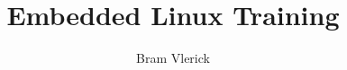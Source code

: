\documentclass[11pt]{beamer}
\author{Bram Vlerick}
\title{Embedded Linux Training}
\institute{}
\begin{document}
\begin{frame}
\titlepage
\end{frame}




\end{document}
